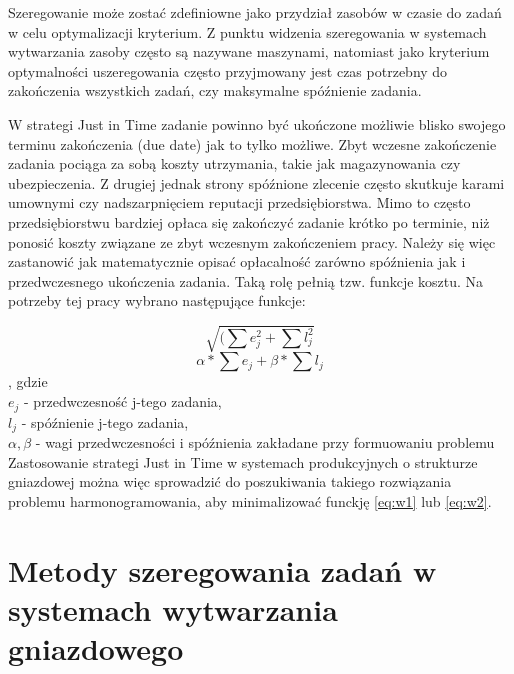 \documentclass[twoside]{kInzynierka}
\begin{document}
Szeregowanie może zostać zdefiniowne jako przydział zasobów w czasie do zadań w celu optymalizacji kryterium. Z punktu widzenia szeregowania w systemach wytwarzania zasoby często są nazywane maszynami, natomiast jako kryterium optymalności uszeregowania często przyjmowany jest czas potrzebny do zakończenia wszystkich zadań, czy maksymalne spóźnienie zadania. \cite{antColony}  

W strategi Just in Time zadanie powinno być ukończone możliwie blisko swojego terminu zakończenia (due date) jak to tylko możliwe. Zbyt wczesne zakończenie zadania pociąga za sobą koszty utrzymania, takie jak magazynowania czy ubezpieczenia. Z drugiej jednak strony spóźnione zlecenie często skutkuje karami umownymi czy nadszarpnięciem reputacji przedsiębiorstwa. Mimo to często przedsiębiorstwu bardziej opłaca się zakończyć zadanie krótko po terminie, niż ponosić koszty związane ze zbyt wczesnym zakończeniem pracy. Należy się więc zastanowić jak matematycznie opisać opłacalność zarówno spóźnienia jak i przedwczesnego ukończenia zadania. Taką rolę pełnią tzw. funkcje kosztu. \cite{genetyczne} Na potrzeby tej pracy wybrano następujące funkcje:

\begin{equation}
    \sqrt{(\sum e_j^2 + \sum l_j^2}
    \label{eq:w1}
\end{equation}
\begin{equation}
    \alpha*\sum e_j + \beta*\sum l_j
    \label{eq:w2}
\end{equation}
, gdzie \\
\(e_j\) - przedwczesność j-tego zadania, \\
\(l_j\) - spóźnienie j-tego zadania, \\
\(\alpha, \beta\) - wagi przedwczesności i spóźnienia zakładane przy formuowaniu problemu\\

Zastosowanie strategi Just in Time w systemach produkcyjnych o strukturze gniazdowej można więc sprowadzić do poszukiwania takiego rozwiązania problemu harmonogramowania, aby minimalizować funckję \ref{eq:w1} lub \ref{eq:w2}.

\section        [Metody szeregowania zadań \ldots]
		        {Metody szeregowania zadań \newline w systemach wytwarzania gniazdowego}
\end{document}
